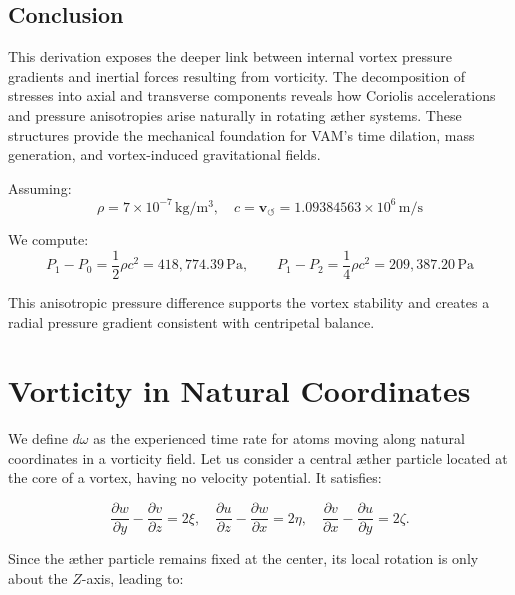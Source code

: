 \documentclass[a4paper,12pt]{article}
\begin{document}
    \subsection*{Conclusion}
    This derivation exposes the deeper link between internal vortex pressure gradients and inertial forces resulting from vorticity. The decomposition of stresses into axial and transverse components reveals how Coriolis accelerations and pressure anisotropies arise naturally in rotating æther systems. These structures provide the mechanical foundation for VAM’s time dilation, mass generation, and vortex-induced gravitational fields.

    \begin{tcolorbox}[colback=gray!10, colframe=black, title=Example: Vortex Pressure Drop]

        Assuming:
        \[
            \rho = 7 \times 10^{-7} \, \mathrm{kg/m^3}, \quad c = \mathbf{v}_{\scriptscriptstyle\boldsymbol{\circlearrowleft}} = 1.09384563 \times 10^6 \, \mathrm{m/s}
        \]

        We compute:
        \[
            P_1 - P_0 = \frac{1}{2} \rho c^2 = \boxed{418{,}774.39 \, \mathrm{Pa}}, \qquad
            P_1 - P_2 = \frac{1}{4} \rho c^2 = \boxed{209{,}387.20 \, \mathrm{Pa}}
        \]

        This anisotropic pressure difference supports the vortex stability and creates a radial pressure gradient consistent with centripetal balance.
    \end{tcolorbox}

        \section{Vorticity in Natural Coordinates}

    We define \( d\omega \) as the experienced time rate for atoms moving along natural coordinates in a vorticity field. Let us consider a central æther particle located at the core of a vortex, having no velocity potential. It satisfies:

    \begin{equation}
        \frac{\partial w}{\partial y} - \frac{\partial v}{\partial z} = 2\xi, \quad
        \frac{\partial u}{\partial z} - \frac{\partial w}{\partial x} = 2\eta, \quad
        \frac{\partial v}{\partial x} - \frac{\partial u}{\partial y} = 2\zeta.
    \end{equation}

    Since the æther particle remains fixed at the center, its local rotation is only about the \(Z\)-axis, leading to:
\end{document}
